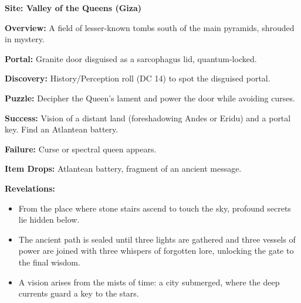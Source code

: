 \documentclass[12pt]{article}
\begin{document}
\textbf{Site: Valley of the Queens (Giza)}

\textbf{Overview:}  
A field of lesser-known tombs south of the main pyramids, shrouded in mystery.

\textbf{Portal:}  
Granite door disguised as a sarcophagus lid, quantum-locked.

\textbf{Discovery:}  
History/Perception roll (DC 14) to spot the disguised portal.

\textbf{Puzzle:}  
Decipher the Queen's lament and power the door while avoiding curses.

\textbf{Success:}  
Vision of a distant land (foreshadowing Andes or Eridu) and a portal key. Find an Atlantean battery.

\textbf{Failure:}  
Curse or spectral queen appears.

\textbf{Item Drops:}  
Atlantean battery, fragment of an ancient message.

\textbf{Revelations:}
\begin{itemize}
  \item From the place where stone stairs ascend to touch the sky, profound secrets lie hidden below.
  \item The ancient path is sealed until three lights are gathered and three vessels of power are joined with three whispers of forgotten lore, unlocking the gate to the final wisdom.
  \item A vision arises from the mists of time: a city submerged, where the deep currents guard a key to the stars.
\end{itemize}
\end{document}

